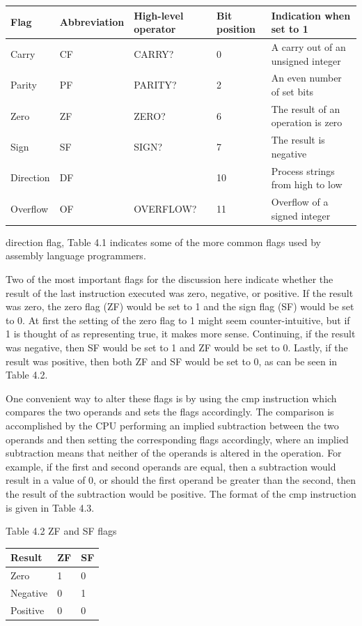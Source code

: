\documentclass[10pt]{book}
\begin{document}
\begin{center}
\begin{tabular}{|l|l|l|l|l|}
\hline
Flag & Abbreviation & High-level operator & Bit position & Indication when set to 1 \\
\hline
Carry & CF & CARRY? & 0 & A carry out of an unsigned integer \\
\hline
Parity & PF & PARITY? & 2 & An even number of set bits \\
\hline
Zero & ZF & ZERO? & 6 & The result of an operation is zero \\
\hline
Sign & SF & SIGN? & 7 & The result is negative \\
\hline
Direction & DF &  & 10 & Process strings from high to low \\
\hline
Overflow & OF & OVERFLOW? & 11 & Overflow of a signed integer \\
\hline
\end{tabular}
\end{center}

direction flag, Table 4.1 indicates some of the more common flags used by assembly language programmers.

Two of the most important flags for the discussion here indicate whether the result of the last instruction executed was zero, negative, or positive. If the result was zero, the zero flag (ZF) would be set to 1 and the sign flag (SF) would be set to 0. At first the setting of the zero flag to 1 might seem counter-intuitive, but if 1 is thought of as representing true, it makes more sense. Continuing, if the result was negative, then SF would be set to 1 and ZF would be set to 0. Lastly, if the result was positive, then both ZF and SF would be set to 0, as can be seen in Table 4.2.

One convenient way to alter these flags is by using the cmp instruction which compares the two operands and sets the flags accordingly. The comparison is accomplished by the CPU performing an implied subtraction between the two operands and then setting the corresponding flags accordingly, where an implied subtraction means that neither of the operands is altered in the operation. For example, if the first and second operands are equal, then a subtraction would result in a value of 0, or should the first operand be greater than the second, then the result of the subtraction would be positive. The format of the cmp instruction is given in Table 4.3.

Table 4.2 ZF and SF flags

\begin{center}
\begin{tabular}{|l|l|l|}
\hline
Result & ZF & SF \\
\hline
Zero & 1 & 0 \\
\hline
Negative & 0 & 1 \\
\hline
Positive & 0 & 0 \\
\hline
\end{tabular}
\end{center}
\end{document}
